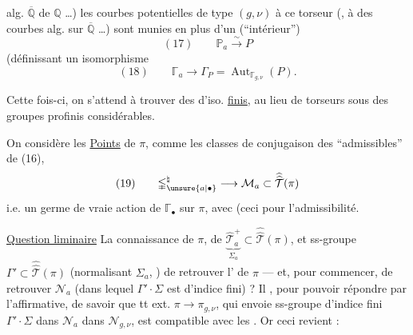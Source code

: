 alg. $\overline{\mathbb Q}$ de $\mathbb Q$ \ldots) les courbes potentielles
de type $(g,\nu)$ \uline{} à ce torseur
(,  à des courbes
alg. sur $\overline{\mathbb Q}$ \ldots) sont  munies en
plus d'un  (``intérieur'')
\[
(17)\qquad \mathbb P_a\xrightarrow{\sim}P
\]
(définissant un isomorphisme
\[
(18)\qquad \mathbb{\Gamma}_a\longrightarrow\Gamma_P
 =\operatorname{Aut}_{\mathbb{\Gamma}_{g,\nu}}(P).
\]

Cette fois-ci, on s'attend à trouver
des  d'iso. \uline{finis}, au lieu de
torseurs sous des groupes profinis
considérables.

On considère les  \uline{Points} de $\pi$,
comme les classes de \inserted{$\pi$-}conjugaison
des  ``admissibles'' de (16),
\[
(19)\qquad\mathbb{\Gamma}_{\unsure{a|\bullet}}^{\natural}\longrightarrow
\mathcal M_a\subset\widehat{\widehat{\mathcal T}}(\pi)
\]
i.e. un germe de vraie action de $\mathbb{\Gamma}_{\bullet}$
sur $\pi$, avec
(ceci pour 
l'admissibilité.

\uline{Question liminaire} La connaissance de
$\pi$, de $\underbrace{\widehat{\mathcal T}_a^+}_{\Sigma_a}
\subset\widehat{\widehat{\mathcal T}}(\pi)$, et  ss-groupe
$\Gamma'\subset\widehat{\widehat{\mathcal T}}(\pi)$
(normalisant $\Sigma_a$, )
 de retrouver l' de $\pi$
--- et, pour commencer, de retrouver
$\mathcal N_a$ (dans lequel $\Gamma'\cdot\Sigma$ est d'indice
fini) ?  Il , pour pouvoir
répondre par l'affirmative, de savoir
que tt  ext. $\pi\longrightarrow\pi_{g,\nu}$,
qui envoie 
 ss-groupe d'indice
fini $\Gamma'\cdot\Sigma$ dans $\mathcal N_a$ dans $\mathcal N_{g,\nu}$,
est compatible avec les .
Or ceci revient  :

